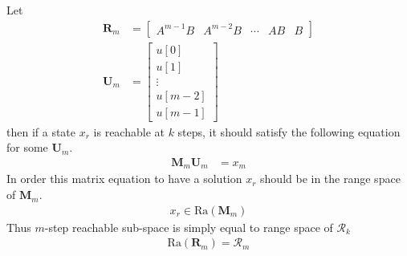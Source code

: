 \documentclass[twoside]{article}
\begin{document}
Let 
\begin{align*}
 \mathbf{R}_m &= 
        \left[ \begin{array}{c|c|c|c|c} A^{m-1} B & A^{m-2} B &
         \cdots & A B & B \end{array} \right]
\\
 \mathbf{U}_m &=
         \left[ \begin{array}{c}
                  u[0] \\ u[1] \\ \vdots \\ u[m-2] \\ u[m-1]
         \end{array} \right]
\end{align*}
%
then if a state $x_r$ is reachable at $k$ steps, it should 
satisfy the following equation for some $\mathbf{U}_m$.
%
\begin{align*}
 \mathbf{M}_m \mathbf{U}_m &= x_m
\end{align*}
%
In order this matrix equation to have a solution $x_r$
should be in the range space of $\mathbf{M}_m$.
%
\begin{align*}
  x_r \in \mathrm{Ra} ( \mathbf{M}_m ) 
\end{align*}
%
Thus $m$-step reachable sub-space is simply equal to range space of $\mathcal{R}_k$
\begin{align*}
  \mathrm{Ra} ( \mathbf{R}_m ) = \mathcal{R}_m
\end{align*}
\end{document}
